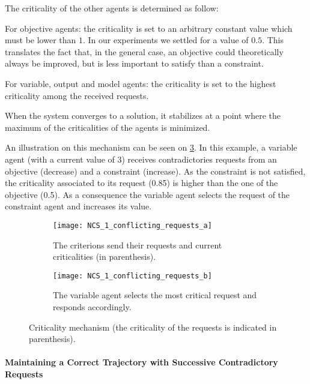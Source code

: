 \noindent The criticality of the other agents is determined as follow:

\begin{compactitem}
\item For objective agents: the criticality is set to an arbitrary constant value which must be lower than \(1\). In our experiments we settled for a value of \(0.5\). This translates the fact that, in the general case, an objective could theoretically always be improved, but is less important to satisfy than a constraint.
\item For variable, output and model agents: the criticality is set to the highest criticality among the received requests.
\end{compactitem}

When the system converges to a solution, it stabilizes at a point where the maximum of the criticalities of the agents is minimized.

An illustration on this mechanism can be seen on \figurename{} \ref{NCS_1_conflicting_requests}. In this example, a variable agent (with a current value of 3) receives contradictories requests from an objective (decrease) and a constraint (increase). As the constraint is not satisfied, the criticality associated to its request (0.85) is higher than the one of the objective (0.5). As a consequence the variable agent selects the request of the constraint agent and increases its value.

\begin{figure}
	\centering
	\begin{subfigure}[b]{0.45\textwidth}
		\centering
		\texttt{[image: NCS\_1\_conflicting\_requests\_a]}
		\caption{The criterions send their requests and current criticalities (in parenthesis).}\label{NCS_1_conflicting_requests_a}
	\end{subfigure}
	\hfill
	\begin{subfigure}[b]{0.45\textwidth}
		\centering
		\texttt{[image: NCS\_1\_conflicting\_requests\_b]}
		\caption{The variable agent selects the most critical request and responds accordingly.}\label{NCS_1_conflicting_requests_b}
	\end{subfigure}
	
\caption{Criticality mechanism (the criticality of the requests is indicated in parenthesis).}\label{NCS_1_conflicting_requests}
\end{figure}

\paragraph*{Maintaining a Correct Trajectory with Successive Contradictory Requests}

